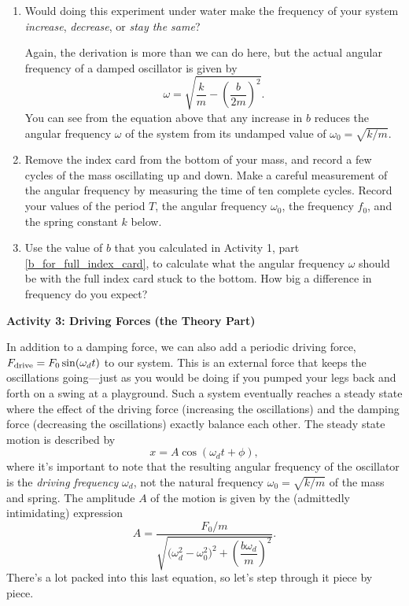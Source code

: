 \begin{enumerate}[labparts]

\item Would doing this experiment under water make the frequency of your system \textit{increase}, \textit{decrease}, or \textit{stay the same}?  
\answerspace{0.6in}

Again, the derivation is more than we can do here, but the actual angular frequency of a damped oscillator is given by
\begin{equation}
\omega =\sqrt{\frac{k}{m} - \left( \frac{b}{2m}\right)^2}.
\label{equation_damped_frequency}
\end{equation}
You can see from the equation above that any increase in $b$ reduces the angular frequency $\omega$ of the system from its undamped value of $\omega_0=\sqrt{k/m}$.  

\item Remove the index card from the bottom of your mass, and record a few cycles of the mass oscillating up and down.  Make a careful measurement of the angular frequency by measuring the time of ten complete cycles.  Record your values of the period $T$, the angular frequency $\omega_0$, the frequency $f_0$, and the spring constant $k$ below.
\label{finding_natural_frequency}
\answerspace{1.2in}

\item Use the value of $b$ that you calculated in Activity 1, part \ref{b_for_full_index_card}, to calculate what the angular frequency $\omega$ should be with the full index card stuck to the bottom.  How big a difference in frequency do you expect? 
\answerspace{0.6in}
 
\end{enumerate}

\textbf{Activity 3: Driving Forces (the Theory Part)}

In addition to a damping force, we can also add a periodic driving force, $F_{\rm drive}=F_0 \sin(\omega_d t)$ to our system.  This is an external force that keeps the oscillations going---just as you would be doing if you pumped your legs back and forth on a swing at a playground.  Such a system eventually reaches a steady state where the effect of the driving force (increasing the oscillations) and the damping force (decreasing the oscillations) exactly balance each other.  The steady state motion is described by
\begin{equation}
x = A \cos(\omega_d t + \phi),
\end{equation}
where it's important to note that the resulting angular frequency of the oscillator is the \textit{driving frequency} 
$\omega_d$, not the natural frequency $\omega_0=\sqrt{k/m}$ of the mass and spring.  
The amplitude $A$ of the motion is given by the (admittedly intimidating) expression
\begin{equation}
A = \frac{F_0/m}{\sqrt{\bigg( \omega_d^2 - \omega_0^2 \bigg)^2 + \left( \dfrac{b\omega_d}{m} \right)^2}}.
\end{equation}
There's a lot packed into this last equation, so let's step through it piece by piece.

